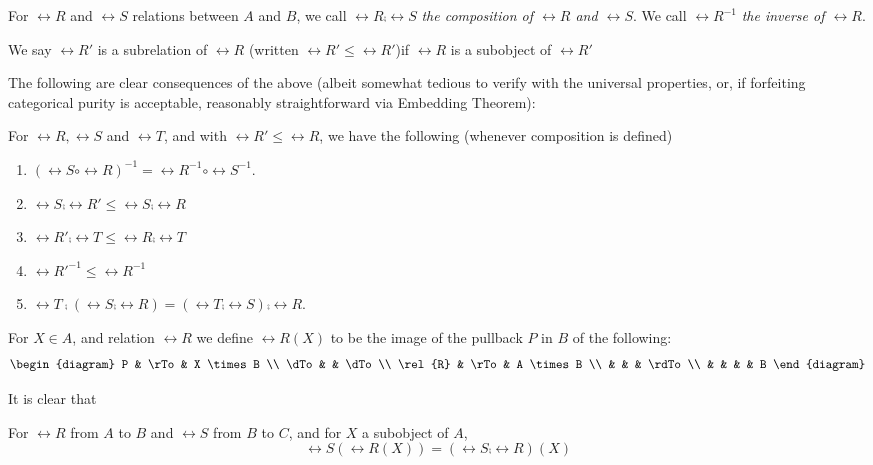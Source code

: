 \begin{definition}\label{relation_inverse}
For $\rel{R}$ and $\rel{S}$ relations between $A$ and $B$, we call
$\rel{R} \comp \rel{S}$ \emph{the composition of $\rel{R}$ and 
$\rel{S}$}. We call $\rel{R}^{-1}$ \emph{the inverse of $\rel{R}$}.
\end{definition}

\begin{definition}
We say $\rel{R}'$ is a subrelation of $\rel{R}$ (written 
$\rel{R}' \leq \rel{R}'$)if $\rel{R}$ is a subobject of $\rel{R}'$
\end{definition}

The following are clear consequences of the above (albeit somewhat
tedious to verify with the universal properties, or, if forfeiting
categorical purity is acceptable, reasonably straightforward via 
Embedding Theorem):

\begin{prop}\label{prop_2_47}
For $\rel{R}, \rel{S}$ and $\rel{T}$, and with $\rel{R}' \leq 
\rel{R}$, we have the following (whenever composition is defined)
\begin{enumerate}
\item $(\rel{S} \circ \rel{R})^{-1} = \rel{R}^{-1} \circ 
\rel{S}^{-1}$.

\item $\rel{S} \comp \rel{R}' \leq \rel{S} \comp \rel{R}$

\item $\rel{R}' \comp \rel{T} \leq \rel{R} \comp \rel{T}$

\item $\rel{R}'^{-1} \leq \rel{R}^{-1}$

\item $\rel{T} \comp (\rel{S} \comp \rel{R}) = (\rel{T} \comp 
\rel{S}) \comp \rel{R}$.
\end{enumerate}
\end{prop}

For $X \in A$, and relation $\rel{R}$ we define $\rel{R}(X)$ to 
be the image of the pullback $P$ in $B$ of the following:
\[
\begin{diagram}
P & \rTo & X \times B \\
\dTo &   & \dTo \\
\rel{R} & \rTo & A \times B \\
    &  &  &  \rdTo \\
    &  &  &   & B
\end{diagram}
\]

It is clear that
\begin{prop}
For $\rel{R}$ from $A$ to $B$ and $\rel{S}$ from $B$ to $C$, and 
for $X$ a subobject of $A$,
\[
\rel{S}(\rel{R}(X)) = (\rel{S} \comp \rel{R})(X)
\]
\end{prop}

